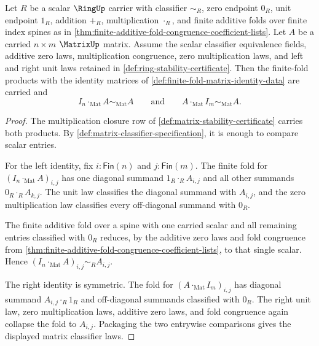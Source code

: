 \begin{theorem}
\label{thm:finite-fold-matrix-identity-law}
Let $R$ be a scalar $\RingUp$ carrier with classifier $\sim_R$, zero endpoint
$0_R$, unit endpoint $1_R$, addition $+_R$, multiplication $\cdot_R$, and finite
additive folds over finite index spines as in
\autoref{thm:finite-additive-fold-congruence-coefficient-lists}. Let $A$ be a carried $n\times m$
$\MatrixUp$ matrix. Assume the scalar classifier equivalence fields, additive
zero laws, multiplication congruence, zero multiplication laws, and left and
right unit laws retained in \autoref{def:ring-stability-certificate}. Then the
finite-fold products with the identity matrices of
\autoref{def:finite-fold-matrix-identity-data} are carried and
$$
I_n\cdot_{\mathrm{Mat}} A\sim_{\mathrm{Mat}}A
\qquad\text{and}\qquad
A\cdot_{\mathrm{Mat}} I_m\sim_{\mathrm{Mat}}A.
$$
\end{theorem}
\begin{proof}
The multiplication closure row of \autoref{def:matrix-stability-certificate}
carries both products. By \autoref{def:matrix-classifier-specification}, it is
enough to compare scalar entries.

For the left identity, fix $i:\mathsf{Fin}(n)$ and $j:\mathsf{Fin}(m)$. The
finite fold for $(I_n\cdot_{\mathrm{Mat}}A)_{i,j}$ has one diagonal summand
$1_R\cdot_R A_{i,j}$ and all other summands $0_R\cdot_R A_{k,j}$. The unit law
classifies the diagonal summand with $A_{i,j}$, and the zero multiplication law
classifies every off-diagonal summand with $0_R$.

The finite additive fold over a spine with one carried scalar and all remaining
entries classified with $0_R$ reduces, by the additive zero laws and fold
congruence from \autoref{thm:finite-additive-fold-congruence-coefficient-lists},
to that single scalar. Hence $(I_n\cdot_{\mathrm{Mat}}A)_{i,j}\sim_R A_{i,j}$.

The right identity is symmetric. The fold for
$(A\cdot_{\mathrm{Mat}}I_m)_{i,j}$ has diagonal summand
$A_{i,j}\cdot_R1_R$ and off-diagonal summands classified with $0_R$. The right
unit law, zero multiplication laws, additive zero laws, and fold congruence
again collapse the fold to $A_{i,j}$. Packaging the two entrywise comparisons
gives the displayed matrix classifier laws.
\end{proof}
